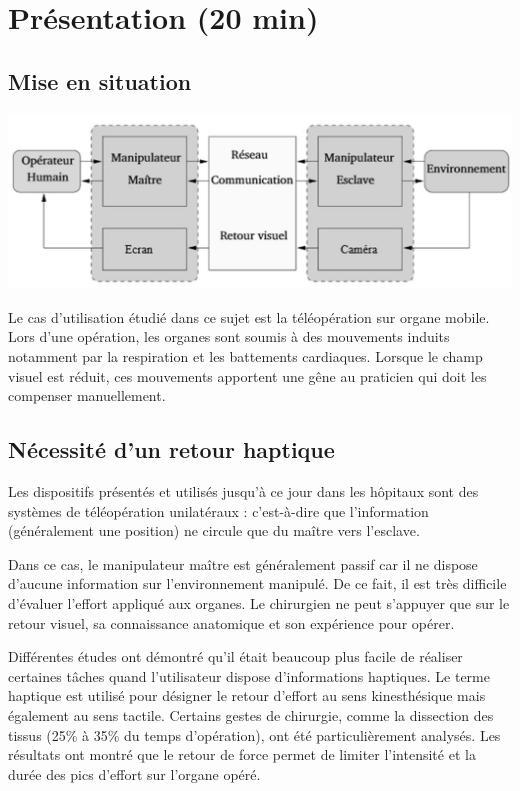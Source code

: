 

\section{Présentation (20 min)}

\subsection{Mise en situation}


\begin{center}
 \includegraphics[width=0.9\linewidth]{img/Figure1}
\end{center}

Le cas d'utilisation étudié dans ce sujet est la téléopération sur organe mobile. Lors d'une opération, les organes sont soumis à des mouvements induits notamment par la respiration et les battements cardiaques. Lorsque le champ visuel est réduit, ces mouvements apportent une gêne au praticien qui doit les compenser manuellement.

\subsection{Nécessité d'un retour haptique}

Les dispositifs présentés et utilisés jusqu'à ce jour dans les hôpitaux sont des systèmes de téléopération unilatéraux : c'est-à-dire que l'information (généralement une position) ne circule que du maître vers l'esclave.

Dans ce cas, le manipulateur maître est généralement passif car il ne dispose d'aucune information sur l'environnement manipulé. De ce fait, il est très difficile d'évaluer l'effort appliqué aux organes. Le chirurgien ne peut s'appuyer que sur le retour visuel, sa connaissance anatomique et son expérience pour  opérer.

Différentes études ont démontré qu'il était beaucoup plus facile de réaliser certaines tâches quand l'utilisateur dispose d'informations haptiques. Le terme haptique est utilisé pour désigner le retour d'effort au sens kinesthésique mais également au sens tactile. Certains gestes de chirurgie, comme la dissection des tissus (25\% à 35\% du temps d'opération), ont été particulièrement analysés. Les résultats ont montré que le retour de force permet de limiter l'intensité et la durée des pics d'effort sur l'organe opéré.

